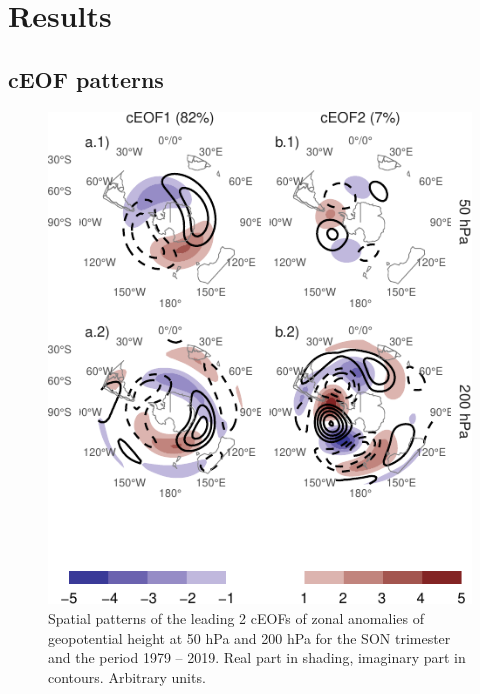 \documentclass[smallextended]{svjour3}       %
\begin{document}
\hypertarget{results}{%
\section{Results}\label{results}}

\hypertarget{ceof-patterns}{%
\subsection{cEOF patterns}\label{ceof-patterns}}

\begin{figure}
\centering
\includegraphics{../figures/ceofs-1-1.pdf}
\caption{\label{fig:ceofs-1}Spatial patterns of the leading 2 cEOFs of zonal anomalies of geopotential height at 50 hPa and 200 hPa for the SON trimester and the period 1979 -- 2019. Real part in shading, imaginary part in contours. Arbitrary units.}
\end{figure}
\end{document}

